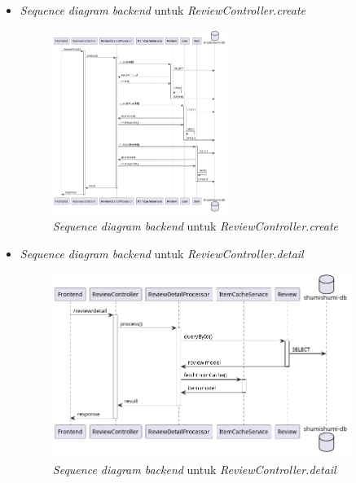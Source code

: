 \documentclass[a4paper]{article}
\begin{document}
\begin{enumerate}
\begin{enumerate}
\begin{itemize}
            \newpage
            \item \textit{Sequence diagram backend} untuk \textit{ReviewController.create}
            \begin{figure}[h]
                \centering
                \includegraphics*[height=6cm]{diagram/sequence diagram/BE/review controller/create/create.png}
                \caption{\textit{Sequence diagram backend} untuk \textit{ReviewController.create}}
            \end{figure}

            \item \textit{Sequence diagram backend} untuk \textit{ReviewController.detail}
            \begin{figure}[h]
                \centering
                \includegraphics*[height=6cm]{diagram/sequence diagram/BE/review controller/detail/detail.png}
                \caption{\textit{Sequence diagram backend} untuk \textit{ReviewController.detail}}
            \end{figure}


\end{itemize}
\end{enumerate}
\end{enumerate}
\end{document}
